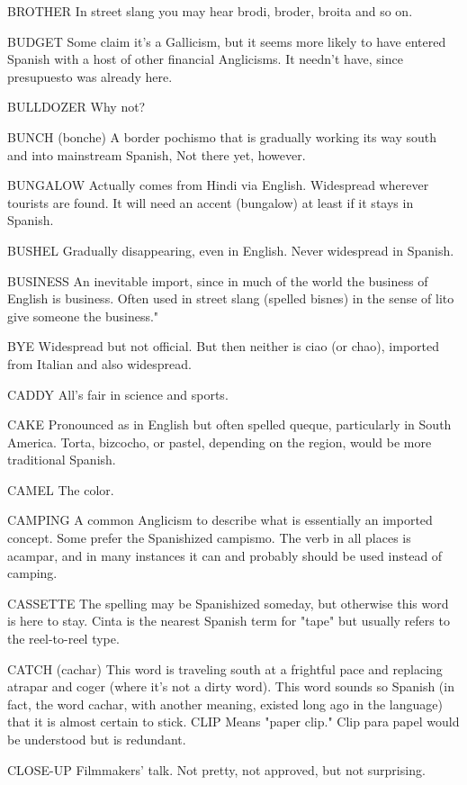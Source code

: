 BROTHER In street slang you may hear brodi, broder, broita
and so on.

BUDGET Some claim it's a Gallicism, but it seems more
likely to have entered Spanish with a host of other financial Anglicisms. It needn't have, since presupuesto was already here.

BULLDOZER Why not?

BUNCH (bonche) A border pochismo that is gradually
working its way south and into mainstream Spanish, Not there yet,
however.

BUNGALOW Actually comes from Hindi via English. Widespread wherever tourists are found. It will need an accent (bungalow)
at least if it stays in Spanish.

BUSHEL Gradually disappearing, even in English. Never widespread in Spanish.

BUSINESS An inevitable import, since in much of the world
the business of English is business. Often used in street slang (spelled
bisnes) in the sense of lito give someone the business."

BYE Widespread but not official. But then neither is ciao (or
chao), imported from Italian and also widespread.

CADDY All's fair in science and sports.

CAKE Pronounced as in English but often spelled queque,
particularly in South America. Torta, bizcocho, or pastel, depending
on the region, would be more traditional Spanish.

CAMEL The color.

CAMPING A common Anglicism to describe what is essentially an imported concept. Some prefer the Spanishized campismo.
The verb in all places is acampar, and in many instances it can and
probably should be used instead of camping.

CASSETTE The spelling may be Spanishized someday, but
otherwise this word is here to stay. Cinta is the nearest Spanish term
for "tape" but usually refers to the reel-to-reel type.

CATCH (cachar) This word is traveling south at a frightful
pace and replacing atrapar and coger (where it's not a dirty word).
This word sounds so Spanish (in fact, the word cachar, with another
meaning, existed long ago in the language) that it is almost certain to
stick.
CLIP Means "paper clip." Clip para papel would be understood but is redundant.

CLOSE-UP Filmmakers' talk. Not pretty, not approved, but
not surprising.

